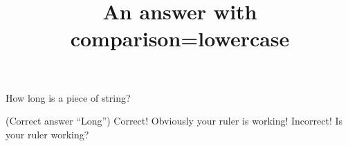 \documentclass[hidesidemenu]{webquiz}
\title{An answer with comparison=lowercase}
\begin{document}
  \begin{question}     %
     How long is a piece of string?

      (Correct answer ``Long'')
     \whenRight Correct! Obviously your ruler is working!
     \whenWrong Incorrect! Is your ruler working?
  \end{question}
\end{document}
